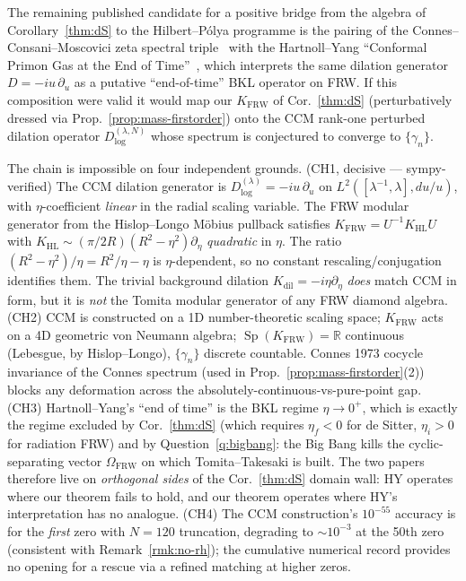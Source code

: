 \documentclass[11pt]{article}
\theoremstyle{definition}
\newcommand{\R}{\mathbb{R}}
\newcommand{\HL}{\mathrm{HL}}
\newcommand{\FRW}{\mathrm{FRW}}
\DeclareMathOperator{\Sp}{Sp}
\begin{document}
The remaining published candidate for a positive bridge from the algebra of Corollary~\ref{thm:dS} to the Hilbert--P\'olya programme is the pairing of the Connes--Consani--Moscovici zeta spectral triple~\cite{ConnesConsaniMoscovici2025ZetaSpectral} with the Hartnoll--Yang ``Conformal Primon Gas at the End of Time''~\cite{HartnollYang2025PrimonEndOfTime}, which interprets the same dilation generator $D = -i u\,\partial_u$ as a putative ``end-of-time'' BKL operator on FRW. If this composition were valid it would map our $K_\FRW$ of Cor.~\ref{thm:dS} (perturbatively dressed via Prop.~\ref{prop:mass-firstorder}) onto the CCM rank-one perturbed dilation operator $D^{(\lambda,N)}_{\mathrm{log}}$ whose spectrum is conjectured to converge to $\{\gamma_n\}$.

The chain is impossible on four independent grounds. (CH1, decisive --- sympy-verified) The CCM dilation generator is $D^{(\lambda)}_{\mathrm{log}} = -i u\,\partial_u$ on $L^2([\lambda^{-1},\lambda], du/u)$, with $\eta$-coefficient \emph{linear} in the radial scaling variable. The FRW modular generator from the Hislop--Longo M\"obius pullback satisfies $K_\FRW = U^{-1} K_\HL U$ with $K_\HL \sim (\pi/2R)(R^2-\eta^2)\partial_\eta$ \emph{quadratic} in $\eta$. The ratio $(R^2-\eta^2)/\eta = R^2/\eta - \eta$ is $\eta$-dependent, so no constant rescaling/conjugation identifies them. The trivial background dilation $K_{\mathrm{dil}} = -i\eta\partial_\eta$ \emph{does} match CCM in form, but it is \emph{not} the Tomita modular generator of any FRW diamond algebra. (CH2) CCM is constructed on a 1D number-theoretic scaling space; $K_\FRW$ acts on a 4D geometric von Neumann algebra; $\Sp(K_\FRW) = \R$ continuous (Lebesgue, by Hislop--Longo), $\{\gamma_n\}$ discrete countable. Connes 1973 cocycle invariance of the Connes spectrum (used in Prop.~\ref{prop:mass-firstorder}(2)) blocks any deformation across the absolutely-continuous-vs-pure-point gap. (CH3) Hartnoll--Yang's ``end of time'' is the BKL regime $\eta \to 0^+$, which is exactly the regime excluded by Cor.~\ref{thm:dS} (which requires $\eta_f<0$ for de Sitter, $\eta_i>0$ for radiation FRW) and by Question~\ref{q:bigbang}: the Big Bang kills the cyclic-separating vector $\Omega_\FRW$ on which Tomita--Takesaki is built. The two papers therefore live on \emph{orthogonal sides} of the Cor.~\ref{thm:dS} domain wall: HY operates where our theorem fails to hold, and our theorem operates where HY's interpretation has no analogue. (CH4) The CCM construction's $10^{-55}$ accuracy is for the \emph{first} zero with $N=120$ truncation, degrading to $\sim 10^{-3}$ at the 50th zero (consistent with Remark~\ref{rmk:no-rh}); the cumulative numerical record provides no opening for a rescue via a refined matching at higher zeros.
\end{document}
